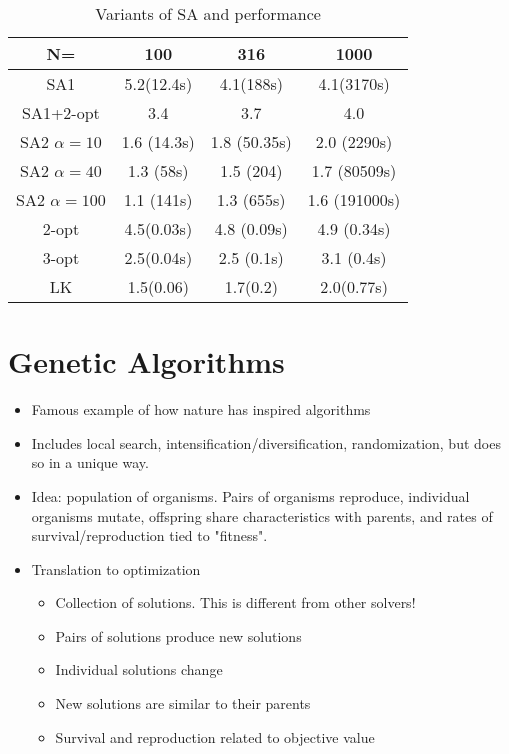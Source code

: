 \documentclass[12pt, letter]{article}
\begin{document}
\begin{table}[h]
	\centering
	\caption{Variants of SA and performance}
	\label{tab:sa}
    \begin{tabular}{|c|c|c|c|}
    \hline
    N= & 100 & 316 & 1000 \\
	\hline
    SA1 & 5.2(12.4s) & 4.1(188s) & 4.1(3170s) \\
    \hline
    SA1+2-opt & 3.4 &  3.7 & 4.0 \\
    \hline
	SA2 $\alpha=10$ & 1.6 (14.3s) & 1.8 (50.35s)& 2.0 (2290s) \\
	\hline
	SA2 $\alpha=40$ & 1.3 (58s) & 1.5 (204)& 1.7 (80509s) \\
	\hline
	SA2 $\alpha=100$ & 1.1 (141s) & 1.3 (655s)& 1.6 (191000s) \\
	\hline
    2-opt & 4.5(0.03s) & 4.8  (0.09s) & 4.9 (0.34s) \\
    \hline
    3-opt & 2.5(0.04s) & 2.5 (0.1s) & 3.1 (0.4s) \\
    \hline
    LK & 1.5(0.06) & 1.7(0.2) & 2.0(0.77s) \\
    \hline
    \end{tabular}
\end{table}

\section{Genetic Algorithms}%
\begin{itemize}
	\item Famous example of how nature has inspired algorithms
	\item Includes local search, intensification/diversification, randomization, but does so in a unique way.
	\item Idea: population of organisms. Pairs of organisms reproduce, individual organisms mutate, offspring share characteristics with parents, and rates of survival/reproduction tied to "fitness".
	\item Translation to optimization
	\begin{itemize}
		\item Collection of solutions. This is different from other solvers!
		\item Pairs of solutions produce new solutions
		\item Individual solutions change
		\item New solutions are similar to their parents
		\item Survival and reproduction related to objective value
	\end{itemize}
\end{itemize}
\end{document}
